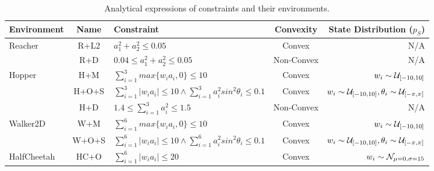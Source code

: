 {
\begin{table*}[htb]
\begin{center}
\setlength\extrarowheight{3.5pt}
\begin{tabular}{l c l c r}
 Environment & Name & Constraint & Convexity & State Distribution ($p_S$) \\ 
 \hline 
Reacher & R+L2 & $a_1^2 + a_2^2 \leq 0.05$ & Convex & N/A \\  
 & R+D & $0.04 \leq a_1^2 + a_2^2 \leq 0.05$ & Non-Convex & N/A\\
 Hopper & H+M & $ \sum_{i=1}^3 max\{w_i a_i, 0\}  \leq 10$ & Convex & $w_i \sim \mathcal{U}_{[-10,10]}$ \\
  & H+O+S & $\sum_{i=1}^3 |w_i a_i|  \leq 10 \land \sum_{i=1}^3 a_i^2 sin^2 \theta_i  \leq 0.1$ & Convex 
  & $w_i \sim \mathcal{U}_{[-10,10]}, \theta_i \sim \mathcal{U}_{[-\pi,\pi]}$
  \\
  & H+D & $1.4 \leq \sum_{i=1}^3a_i^2 \leq 1.5$ & Non-Convex & N/A \\
Walker2D & W+M & $ \sum_{i=1}^6 max\{w_i a_i, 0\}  \leq 10$ & Convex & $w_i \sim \mathcal{U}_{[-10,10]}$ \\
  & W+O+S & $\sum_{i=1}^6 |w_i a_i|  \leq 10 \land \sum_{i=1}^6 a_i^2 sin^2 \theta_i  \leq 0.1$ & Convex
  & $w_i \sim \mathcal{U}_{[-10,10]}, \theta_i \sim \mathcal{U}_{[-\pi,\pi]}$ \\
HalfCheetah & HC+O & $\sum_{i=1}^6 |w_i a_i|  \leq 20$ & Convex & $w_i \sim \mathcal{N}_{\mu=0, \sigma=15}$ \\
\end{tabular}
\end{center}
\caption{Analytical expressions of constraints and their environments.}\label{sup:envs}
\end{table*}

}
